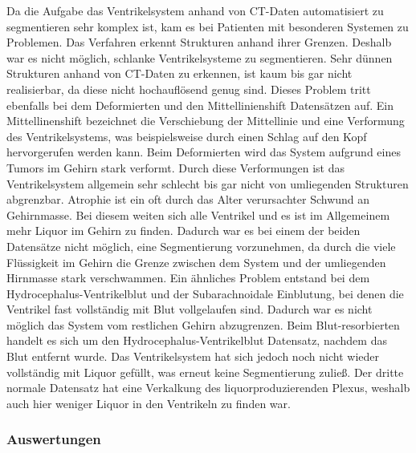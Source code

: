 Da die Aufgabe das Ventrikelsystem anhand von CT-Daten automatisiert zu segmentieren sehr komplex ist, kam es bei Patienten mit besonderen Systemen zu Problemen.
Das Verfahren erkennt Strukturen anhand ihrer Grenzen. Deshalb war es nicht möglich, schlanke Ventrikelsysteme zu segmentieren. Sehr dünnen Strukturen anhand von CT-Daten zu erkennen, ist kaum bis gar nicht realisierbar, da diese nicht hochauflösend genug sind. Dieses Problem tritt ebenfalls bei dem Deformierten und den Mittellinienshift Datensätzen auf. Ein Mittellinenshift bezeichnet die Verschiebung der Mittellinie und eine Verformung des Ventrikelsystems, was beispielsweise durch einen Schlag auf den Kopf hervorgerufen werden kann. Beim Deformierten wird das System aufgrund eines Tumors im Gehirn stark verformt. Durch diese Verformungen ist das Ventrikelsystem allgemein sehr schlecht bis gar nicht von umliegenden Strukturen abgrenzbar.
\newline
Atrophie ist ein oft durch das Alter verursachter Schwund an Gehirnmasse. Bei diesem weiten sich alle Ventrikel und es ist im Allgemeinem mehr Liquor im Gehirn zu finden. Dadurch war es bei einem der beiden Datensätze nicht möglich, eine Segmentierung vorzunehmen, da durch die viele Flüssigkeit im Gehirn die Grenze zwischen dem System und der umliegenden Hirnmasse stark verschwammen.
Ein ähnliches Problem entstand bei dem Hydrocephalus-Ventrikelblut und der Subarachnoidale Einblutung, bei denen die Ventrikel fast vollständig mit Blut vollgelaufen sind. Dadurch war es nicht möglich das System vom restlichen Gehirn abzugrenzen.
Beim Blut-resorbierten  handelt es sich um den Hydrocephalus-Ventrikelblut Datensatz, nachdem das Blut entfernt wurde. Das Ventrikelsystem hat sich jedoch noch nicht wieder vollständig mit Liquor gefüllt, was erneut keine Segmentierung zuließ.
Der dritte normale Datensatz hat eine Verkalkung des liquorproduzierenden Plexus, weshalb auch hier weniger Liquor in den Ventrikeln zu finden war.



\subsubsection{Auswertungen}

